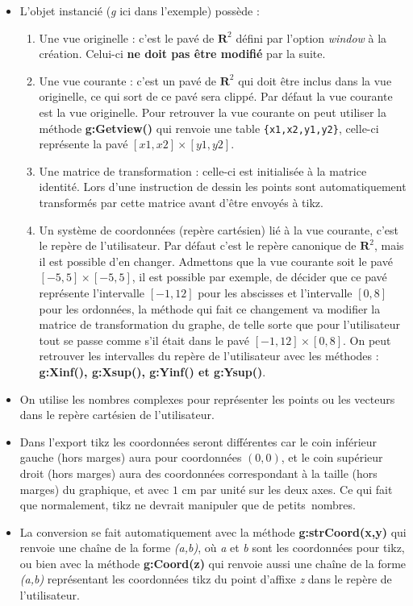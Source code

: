 \begin{itemize}
\item L'objet instancié (\emph{g} ici dans l'exemple) possède :
    \begin{enumerate}
        \item Une vue originelle : c'est le pavé de $\mathbf R^2$ défini par l'option \emph{window} à la création. Celui-ci \textbf{ne doit pas être modifié} par la suite.
        \item Une vue courante : c'est un pavé de $\mathbf R^2$ qui doit être inclus dans la vue originelle, ce qui sort de ce pavé sera clippé. Par défaut la vue courante est la vue originelle. Pour retrouver la vue courante on peut utiliser la méthode \textbf{g:Getview()} qui renvoie une table \verb|{x1,x2,y1,y2}|, celle-ci représente la pavé $[x1,x2]\times [y1,y2]$.
        \item Une matrice de transformation : celle-ci est initialisée à la matrice identité. Lors d'une instruction de dessin les points sont automatiquement transformés par cette matrice avant d'être envoyés à tikz.
        \item Un système de coordonnées (repère cartésien) lié à la vue courante, c'est le repère de l'utilisateur. Par défaut c'est le repère canonique de $\mathbf R^2$, mais il est possible d'en changer. Admettons que la vue courante soit le pavé $[-5,5]\times[-5,5]$, il est possible par exemple, de décider que ce pavé représente l'intervalle $[-1,12]$ pour les abscisses et l'intervalle $[0,8]$ pour les ordonnées, la méthode qui fait ce changement va modifier la matrice de transformation du graphe, de telle sorte que pour l'utilisateur tout se passe comme s'il était dans le pavé $[-1,12]\times [0,8]$. On peut retrouver les intervalles du repère de l'utilisateur avec les méthodes : \textbf{g:Xinf(), g:Xsup(), g:Yinf() et g:Ysup()}.
    \end{enumerate}
\item On utilise les nombres complexes pour représenter les points ou les vecteurs dans le repère cartésien de l'utilisateur.
\item Dans l'export tikz les coordonnées seront différentes car le coin inférieur gauche (hors marges) aura pour coordonnées $(0,0)$, et le coin supérieur droit (hors marges) aura des coordonnées correspondant à la taille (hors marges) du graphique, et avec $1$ cm par unité sur les deux axes. Ce qui fait que normalement, tikz ne devrait manipuler que de \og petits\fg\ nombres.
\item La conversion se fait automatiquement avec la méthode \textbf{g:strCoord(x,y)} qui renvoie une chaîne de la forme \emph{(a,b)}, où \emph{a} et \emph{b} sont les coordonnées pour tikz, ou bien avec la méthode \textbf{g:Coord(z)} qui renvoie aussi une chaîne de la forme \emph{(a,b)} représentant les coordonnées tikz du point d'affixe \emph{z} dans le repère de l'utilisateur.
\end{itemize}

